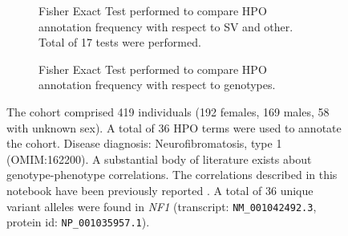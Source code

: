 \begin{figure}[htbp]\ContinuedFloat
\begin{subfigure}[b]{0.95\textwidth}
\centering
{}
\captionsetup{justification=raggedright,singlelinecheck=false}
\caption{Fisher Exact Test performed to compare HPO annotation frequency with respect to SV and other. Total of 17 tests were performed.}
\end{subfigure}

\begin{subfigure}[b]{0.95\textwidth}
\centering
{}
\captionsetup{justification=raggedright,singlelinecheck=false}
\caption{Fisher Exact Test performed to compare HPO annotation frequency with respect to genotypes. }
\end{subfigure}



\caption{ The cohort comprised 419 individuals (192 females, 169 males, 58 with unknown sex). A total of 36 HPO terms were used to annotate the cohort. Disease diagnosis: Neurofibromatosis, type 1 (OMIM:162200). A substantial body of literature exists about genotype-phenotype correlations. The correlations described in this notebook
have been previously reported \cite{PMID_26178382,PMID_17160901,PMID_20513137}.
 A total of 36 unique variant alleles were found in \textit{NF1} (transcript: \texttt{NM\_001042492.3}, protein id: \texttt{NP\_001035957.1}).}
\end{figure}
